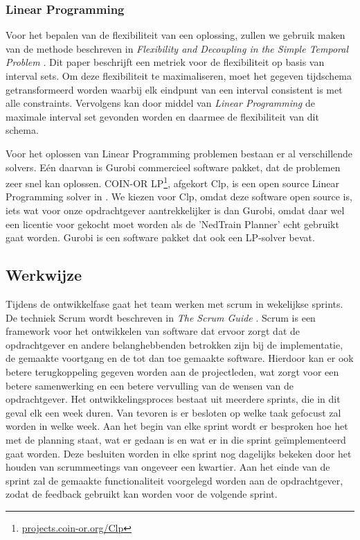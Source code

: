 \subsubsection*{Linear Programming}
Voor het bepalen van de flexibiliteit van een oplossing, zullen we gebruik maken van de methode beschreven in \emph{Flexibility and Decoupling in the Simple Temporal Problem} \cite{wilson2013flexibility}. Dit paper beschrijft een metriek voor de flexibiliteit op basis van interval sets. Om deze flexibiliteit te maximaliseren, moet het gegeven tijdschema getransformeerd worden waarbij elk eindpunt van een interval consistent is met alle constraints. Vervolgens kan door middel van \emph{Linear Programming} de maximale interval set gevonden worden en daarmee de flexibiliteit van dit schema.

Voor het oplossen van Linear Programming problemen bestaan er al verschillende solvers. E\'en daarvan is Gurobi commercieel software pakket, dat de problemen zeer snel kan oplossen. COIN-OR LP\footnote{\href{http://projects.coin-or.org/Clp}{projects.coin-or.org/Clp}}, afgekort Clp, is een open source Linear Programming solver in \cpp . We kiezen voor Clp, omdat deze software open source is, iets wat voor onze opdrachtgever aantrekkelijker is dan Gurobi, omdat daar wel een licentie voor gekocht moet worden als de 'NedTrain Planner' echt gebruikt gaat worden. Gurobi is een software pakket dat ook een LP-solver bevat.

\subsection{Werkwijze}
Tijdens de ontwikkelfase gaat het team werken met scrum in wekelijkse sprints. De techniek Scrum wordt beschreven in \emph{The Scrum Guide} \cite{schwaber2011}. Scrum is een framework voor het ontwikkelen van software dat ervoor zorgt dat de opdrachtgever en andere belanghebbenden betrokken zijn bij de implementatie, de gemaakte voortgang en de tot dan toe gemaakte software. Hierdoor kan er ook betere terugkoppeling gegeven worden aan de projectleden, wat zorgt voor een betere samenwerking en een betere vervulling van de wensen van de opdrachtgever. Het ontwikkelingsproces bestaat uit meerdere sprints, die in dit geval elk een week duren. Van tevoren is er besloten op welke taak gefocust zal worden in welke week. Aan het begin van elke sprint wordt er besproken hoe het met de planning staat, wat er gedaan is en wat er in die sprint ge\"implementeerd gaat worden. Deze besluiten worden in elke sprint nog dagelijks bekeken door het houden van scrummeetings van ongeveer een kwartier. Aan het einde van de sprint zal de gemaakte functionaliteit voorgelegd worden aan de opdrachtgever, zodat de feedback gebruikt kan worden voor de volgende sprint. 

